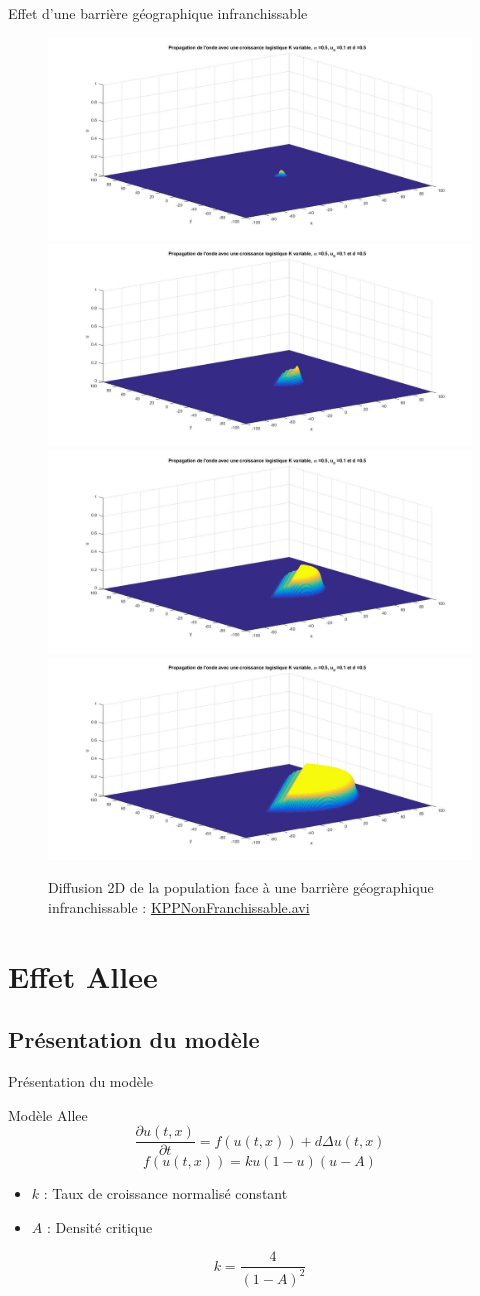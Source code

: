 \documentclass[10pt]{beamer}
\begin{document}
\begin{frame}{Effet d'une barrière géographique infranchissable}{}
\begin{figure}[H]
	\centering
	\includegraphics[width=0.5\linewidth]{SimulationKPP/Enviro/poleNord1}\hfill
	\includegraphics[width=0.5\linewidth]{SimulationKPP/Enviro/poleNord3}\hfill
	\includegraphics[width=0.5\linewidth]{SimulationKPP/Enviro/poleNord5}\hfill
	\includegraphics[width=0.5\linewidth]{SimulationKPP/Enviro/poleNord8}
	\caption{Diffusion 2D de la population face à une barrière géographique infranchissable : \url{KPPNonFranchissable.avi} }
	
\end{figure}

\end{frame}


\section{Effet Allee}
\subsection{Présentation du modèle}
\begin{frame}{Présentation du modèle}{}
\begin{block}{Modèle Allee}
	$$\frac{\partial u(t,x)}{\partial t}=f(u(t,x))+d\Delta u(t,x)$$
	$$f(u(t,x))=ku(1-u)(u-A)$$
\end{block}
\begin{itemize}
    \item $k$ : Taux de croissance normalisé constant 
    \item $A$ : Densité critique
\end{itemize}
$$k=\frac{4}{(1-A)^2}$$
\end{frame}
\end{document}
